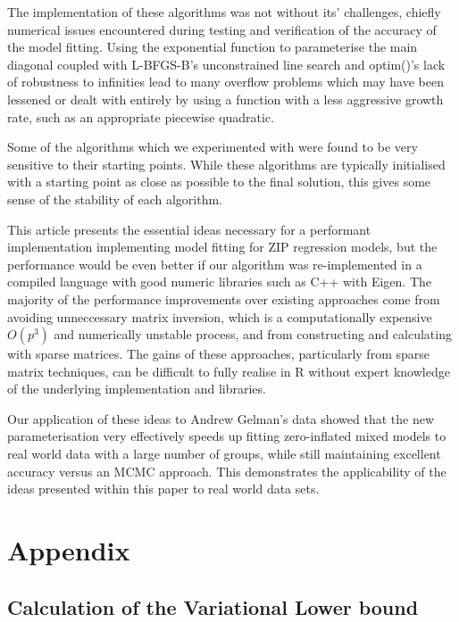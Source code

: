 \documentclass[times, doublespace]{anzsauth}
\begin{document}
	\noindent The implementation of these algorithms was not without its' challenges, chiefly numerical issues encountered during testing and verification of the accuracy of the model fitting. Using the exponential function to parameterise the main diagonal coupled with L-BFGS-B's unconstrained line search and optim()'s lack of robustness to infinities lead to many overflow problems which may have been lessened or dealt with entirely by using a function with a less aggressive growth rate, such as an appropriate piecewise quadratic.
	
	Some of the algorithms which we experimented with were found to be very sensitive to their starting points.
	While these algorithms are typically initialised with a starting point as close as possible to the final
	solution, this gives some sense of the stability of each algorithm.
	
	This article presents the essential ideas necessary for a performant implementation implementing model fitting
	for ZIP regression models, but the performance would be even better if our algorithm was re-implemented in a
	compiled language with good numeric libraries such as C++ with Eigen. The majority of the performance
	improvements over existing approaches come from avoiding unneccessary matrix inversion, which is a
	computationally expensive $O(p^3)$ and numerically unstable process, and from constructing and calculating
	with sparse matrices. The gains of these approaches, particularly from sparse matrix techniques, can be
	difficult to fully realise in R without expert knowledge of the underlying implementation and libraries.
	
	Our application of these ideas to Andrew Gelman's data showed that the new parameterisation very effectively
	speeds up fitting zero-inflated mixed models to real world data with a large number of groups, while still
	maintaining excellent accuracy versus an MCMC approach. This demonstrates the applicability of the ideas
	presented within this paper to real world data sets.
	
	\newpage
	\section{Appendix} 
	\subsection{Calculation of the Variational Lower bound}
	
\end{document}

